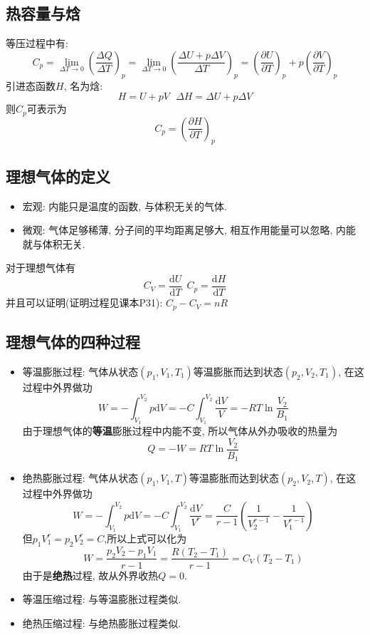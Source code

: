 \subsection{热容量与焓}
等压过程中有:
$$
    C_p=\lim_{\Delta T\rightarrow 0} \left(\frac{\Delta Q}{\Delta T
    }\right)_p =\lim_{\Delta T\rightarrow 0} \left(\frac{\Delta U+p\Delta
        V }{\Delta T }\right)_p =\left(\frac{\partial U}{\partial
        T}\right)_p+p\left(\frac{\partial V}{\partial T}\right)_p
$$
引进态函数$H$, 名为焓:
$$
    H=U+pV \ \ \ \Delta H=\Delta U+p\Delta V
$$
则$C_p$可表示为
$$
    C_p=\left(\frac{\partial H}{\partial T}\right)_p
$$


\subsection{理想气体的定义}

\begin{itemize}
    \item 宏观: 内能只是温度的函数, 与体积无关的气体.
    \item 微观: 气体足够稀薄, 分子间的平均距离足够大, 相互作用能量可以忽略, 内能就与体积无关.
\end{itemize}
对于理想气体有
$$
    C_V=\frac{\mathrm{d}U}{\mathrm{d}T} \ \
    C_p=\frac{\mathrm{d}H}{\mathrm{d}T}
$$
并且可以证明(证明过程见课本P31): $C_p-C_V=nR$

\subsection{理想气体的四种过程}
\begin{itemize}
    \item 等温膨胀过程: 气体从状态$(p_1,V_1,T_1)$等温膨胀而达到状态$(p_2,V_2,T_1)$, 在这过程中外界做功
          $$
              W=-\int_{V_1}^{V_2}p\mathrm{d}V=-C\int_{V_1}^{V_2}\frac{\mathrm{d}V}{V}=-RT\ln\frac{V_2}{B_1}
          $$
          由于理想气体的\textbf{等温}膨胀过程中内能不变, 所以气体从外办吸收的热量为
          $$
              Q=-W=RT\ln\frac{V_2}{B_1}
          $$

    \item 绝热膨胀过程: 气体从状态$(p_1,V_1,T)$等温膨胀而达到状态$(p_2,V_2,T)$, 在这过程中外界做功
          $$
              W=-\int_{V_1}^{V_2}p\mathrm{d}V=-C\int_{V_1}^{V_2}\frac{\mathrm{d}V}{V^r}=\frac{C}{r-1}\left(\frac{1}{V_2^{r-1}}-\frac{1}{V_1^{r-1}}\right)
          $$
          但$p_1V_1^r=p_2V_2^r=C$,所以上式可以化为
          $$
              W=\frac{p_2V_2-p_1V_1}{r-1}=\frac{R(T_2-T_1)}{r-1}=C_V(T_2-T_1)
          $$
          由于是\textbf{绝热}过程, 故从外界收热$Q=0$.

    \item 等温压缩过程: 与等温膨胀过程类似.
    \item 绝热压缩过程: 与绝热膨胀过程类似.
\end{itemize}


